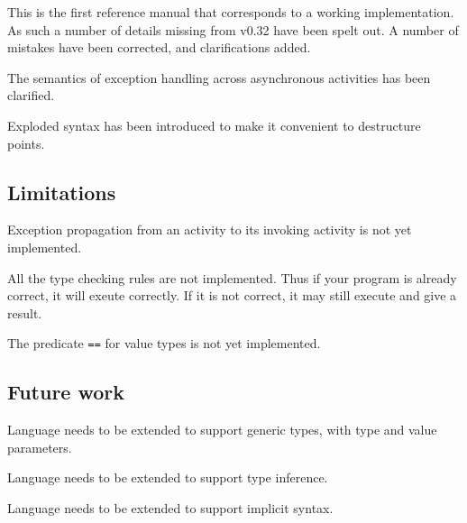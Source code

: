 
This is the first reference manual that corresponds to a working
implementation. As such a number of details missing from v0.32 have
been spelt out. A number of mistakes have been corrected, and
clarifications added.

The semantics of exception handling across asynchronous activities has
been clarified.

Exploded syntax has been introduced to make it convenient to
destructure points. 

\subsection{Limitations}

Exception propagation from an activity to its invoking activity is not
yet implemented.

All the type checking rules are not implemented. Thus if your program
is already correct, it will exeute correctly. If it is not correct, it
may still execute and give a result.

The predicate {\tt ==} for value types is not yet implemented.


\subsection{Future work}

Language needs to be extended to support generic types, with
type and value parameters.

Language needs to be extended to support type inference.

Language needs to be extended to support implicit syntax.